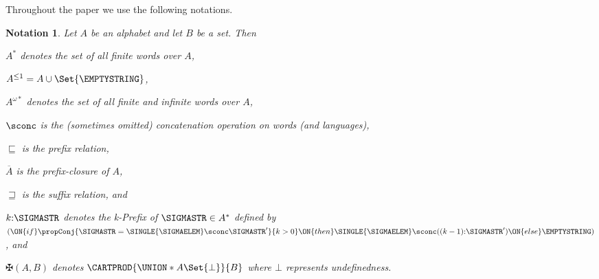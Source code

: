 \documentclass[draft]{ifacconf}
\newtheorem{notation}{Notation}
\newcommand{\UNDEF}{\bot}
\newcommand{\PC}[1]{\overline{#1}}
\newcommand{\PREFIX}[2]{#1 \sqsubseteq #2}
\newcommand{\SUFFIX}[2]{#1 \sqsupseteq #2}
\newcommand{\IFTHENELSE}[3]{\ON{if }#1\ON{ then }#2\ON{ else }#3\xspace}
\newcommand{\AnConf}[2]{\mathrm{\maltese}(#1,#2)\xspace}
\newcommand{\kPREFIX}[2][k]{{#1}{:}#2\xspace}
\begin{document}
Throughout the paper we use the following notations.
\begin{notation}
Let $A$ be an alphabet and let $B$ be a set. Then
\begin{inparaenum}[(i)]
\item $A^*$ denotes the set of all finite words over $A$,
\item $A^{\leq1}=A\cup\Set{\EMPTYSTRING}$,
\item $A^{\omega *}$ denotes the set of all finite and infinite words over $A$,
\item $\sconc$ is the (sometimes omitted) concatenation operation on words (and languages), 
\item $\PREFIX{}{}$ is the prefix relation, \item $\PC{A}$ is the prefix-closure of $A$, \item $\SUFFIX{}{}$ is the suffix relation, and \item $\kPREFIX{\SIGMASTR}$ denotes the k-Prefix of $\SIGMASTR\in A^*$ defined by $(\IFTHENELSE{\propConj{\SIGMASTR=\SINGLE{\SIGMAELEM}\sconc \SIGMASTR'}{k>0}}{\SINGLE{\SIGMAELEM}\sconc(\kPREFIX[(k-1)]{\SIGMASTR'})}{\EMPTYSTRING})$, and
\item $\AnConf{A}{B}$ denotes $\CARTPROD{\UNION*{A}{\Set{\UNDEF}}}{B}$ where $\UNDEF$ represents undefinedness.
\end{inparaenum}
\end{notation}
\end{document}
